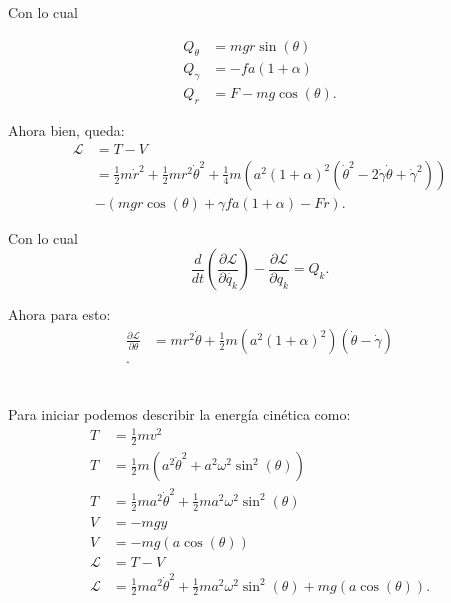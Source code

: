\documentclass{report}
\begin{document}
Con lo cual

\begin{align*}
  Q_\theta &= mgr\sin\left( \theta \right)  \\
  Q_\gamma &= - fa\left( 1 + \alpha \right)  \\
  Q_r &= F - mg\cos\left( \theta \right)
.\end{align*}

Ahora bien, queda:
\begin{align*}
  \mathcal{L} &= T - V \\
  &=  \frac{1}{2}m\dot{r}^2 + \frac{1}{2}m r^2\dot{\theta}^2 +\frac{1}{4}m \left( a^2 \left( 1 + \alpha \right)^2 \left( \dot{\theta}^2 - 2\dot{\gamma}\dot{\theta} + \dot{\gamma}^2 \right)  \right)\\
  &- \left( mgr\cos\left( \theta \right) + \gamma fa\left( 1 + \alpha \right) - Fr \right) 
.\end{align*}

Con lo cual \[
  \frac{d}{dt}\left( \frac{\partial \mathcal{L}}{\partial \dot{q_k}}  \right) - \frac{\partial \mathcal{L}}{\partial q_k} = Q_k
.\] 

Ahora para esto:
\begin{align*}
  \frac{\partial \mathcal{L}}{\partial \theta} &= mr^2\dot{\theta} + \frac{1}{2}m\left( a^2\left( 1 + \alpha \right)^2 \right)\left( \dot{\theta} - \dot{\gamma} \right)  \\
.\end{align*}

\chapter{}

Para iniciar podemos describir la energía cinética como:
\begin{align*}
  T &= \frac{1}{2}mv^2 \\
  T &= \frac{1}{2}m\left( a^2\dot{\theta}^2 + a^2\omega^2 \sin^2\left( \theta \right)  \right)  \\
  T &= \frac{1}{2}ma^2\dot{\theta}^2 + \frac{1}{2}ma^2\omega^2\sin^2\left( \theta \right)  \\
  V &= -mgy\\
  V &= -mg\left( a \cos\left( \theta \right)  \right)  \\
  \mathcal{L} &= T - V \\
  \mathcal{L} &= \frac{1}{2}ma^2\dot{\theta}^2 + \frac{1}{2}ma^2\omega^2\sin^2\left( \theta \right) + mg\left( a \cos\left( \theta \right) \right) 
.\end{align*}
\end{document}
